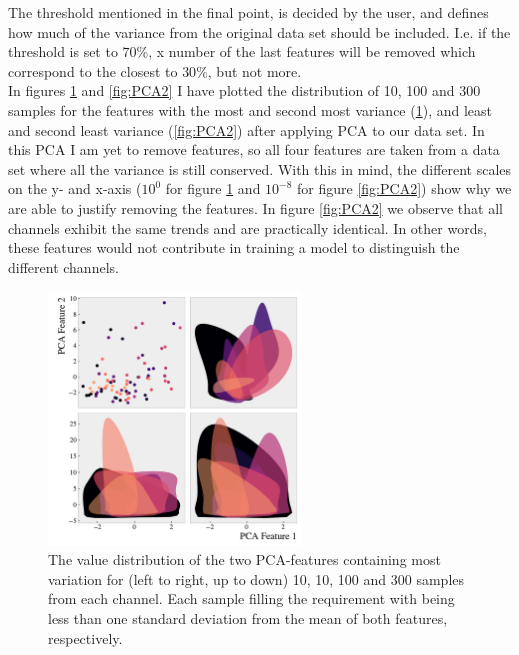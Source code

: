 The threshold mentioned in the final point, is decided by the user, and defines how much of the variance from the original data 
set should be included. I.e. if the threshold is set to $70\%$, x number of the last features will be removed which correspond to 
the closest to $30\%$, but not more.
\\
In figures \ref{fig:PCA1} and \ref{fig:PCA2} I have plotted the distribution of 10, 100 and 300 samples 
for the features with the most and second most variance (\ref{fig:PCA1}), and least and second least 
variance (\ref{fig:PCA2}) after applying \ac{PCA} to our data set. In this \ac{PCA} I am yet to remove features, 
so all four features are taken from a data set where all the variance is still conserved. With this in 
mind, the different scales on the y- and x-axis ($10^0$ for figure \ref{fig:PCA1} and $10^{-8}$ for figure 
\ref{fig:PCA2}) show why we are able to justify removing the features. In figure \ref{fig:PCA2} we observe 
that all channels exhibit the same trends and are practically identical. In other words, these features 
would not contribute in training a model to distinguish the different channels.
\begin{figure}
    \centering
    \includegraphics[width=0.6\textwidth]{Figures/MLResults/DataHandling/PCA/PCAPlotFirst.pdf}
    \caption[The value distribution of the two leading \acs{PCA}-features.]{The value distribution of 
    the two \ac{PCA}-features containing most variation for (left to right, up to down) 10, 10, 100 and 
    300 samples from each channel. Each sample filling the requirement with being less than one standard 
    deviation from the mean of both features, respectively.}
    \label{fig:PCA1}
\end{figure}
